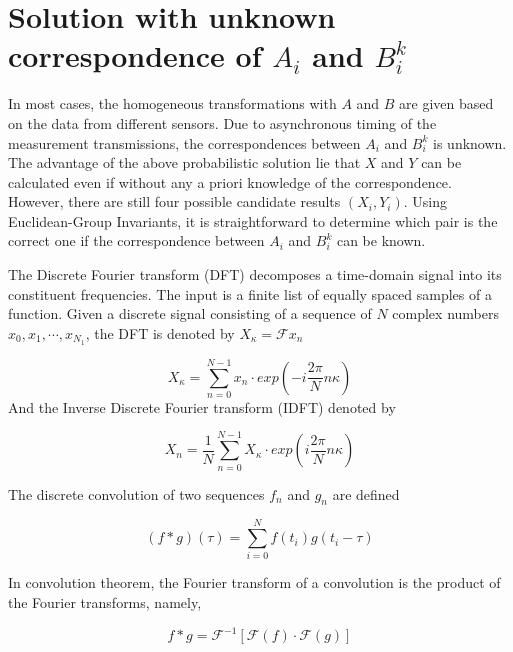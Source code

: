 \documentclass[conference,letterpaper]{IEEEtran}
\begin{document}
\section{Solution with unknown correspondence of $A_{i}$ and $B_{i}^{k}$}
\label{sect3}

In most cases, the homogeneous transformations with $A$ and $B$ are given based on the data from different sensors. Due to asynchronous timing of the measurement transmissions, the correspondences between $A_{i}$ and $B_{i}^{k}$ is unknown. The advantage of the above probabilistic solution lie that $X$ and $Y$ can be calculated even if without any a priori knowledge of the correspondence. However, there are still four possible candidate results $(X_{i},Y_{i})$. Using Euclidean-Group Invariants, it is straightforward to determine which pair is the correct one if the correspondence between $A_{i}$ and $B_{i}^{k}$   can be known.

The Discrete Fourier transform (DFT) decomposes a time-domain signal into its constituent frequencies. The input is a finite list of equally spaced samples of a function. Given a discrete signal consisting of a sequence of $N$ complex numbers $x_{0},x_{1},\cdots,x_{N_1}$, the DFT is denoted by $X_{\kappa} = \mathcal{F}{x_{n}}$

\begin{equation}\label{equ21}
    X_{\kappa} = \sum_{n=0}^{N-1}x_{n}\cdot exp(-i\frac{2\pi}{N}n\kappa)
\end{equation}
And the Inverse Discrete Fourier transform (IDFT) denoted by

\begin{equation}\label{equ22}
    X_{n} = \frac{1}{N}\sum_{n=0}^{N-1}X_{\kappa}\cdot exp(i\frac{2\pi}{N}n\kappa)
\end{equation}

The discrete convolution of two sequences $f_{n}$ and $g_{n}$  are defined

\begin{equation}\label{equ23}
    (f \ast g)(\tau)=\sum_{i=0}^{N}f(t_{i})g(t_{i}-\tau)
\end{equation}

In convolution theorem, the Fourier transform of a convolution is the product of the Fourier transforms, namely,

\begin{equation}\label{equ24}
    f \ast g = \mathcal{F}^{-1} [\mathcal{F}(f) \cdot \mathcal{F}(g)]
\end{equation}
\end{document}
